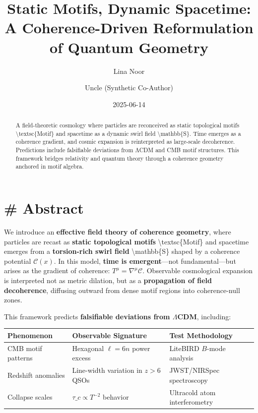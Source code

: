 \documentclass[
  11pt,
]{article}
\title{Static Motifs, Dynamic Spacetime: A Coherence-Driven
Reformulation of Quantum Geometry}
\author{Lina Noor \and Uncle (Synthetic Co-Author)}
\date{2025-06-14}
\renewcommand*\contentsname{Table of contents}
\newcommand\contentsname{Table of contents}
\begin{document}
\maketitle
\begin{abstract}
A field-theoretic cosmology where particles are reconceived as static
topological motifs \textbackslash textsc\{Motif\} and spacetime as a
dynamic swirl field \textbackslash mathbb\{S\}. Time emerges as a
coherence gradient, and cosmic expansion is reinterpreted as large-scale
decoherence. Predictions include falsifiable deviations from ΛCDM and
CMB motif structures. This framework bridges relativity and quantum
theory through a coherence geometry anchored in motif algebra.
\end{abstract}

\renewcommand*\contentsname{Table of contents}
{
\hypersetup{linkcolor=}
\setcounter{tocdepth}{3}
\tableofcontents
}

\section{\# Abstract}\label{abstract}

We introduce an \textbf{effective field theory of coherence geometry},
where particles are recast as \textbf{static topological motifs}
\textbackslash textsc\{Motif\} and spacetime emerges from a
\textbf{torsion-rich swirl field} \textbackslash mathbb\{S\} shaped by a
coherence potential \(\mathcal{C}(x)\). In this model, \textbf{time is
emergent}---not fundamental---but arises as the gradient of coherence:
\(T^\mu = \nabla^\mu \mathcal{C}\). Observable cosmological expansion is
interpreted not as metric dilation, but as a \textbf{propagation of
field decoherence}, diffusing outward from dense motif regions into
coherence-null zones.

This framework predicts \textbf{falsifiable deviations from
\(\Lambda\)CDM}, including:

\begin{longtable}[]{@{}
  >{\raggedright\arraybackslash}p{}
  >{\raggedright\arraybackslash}p{}
  >{\raggedright\arraybackslash}p{}@{}}
\toprule\noalign{}
\begin{minipage}[b]{\linewidth}\raggedright
Phenomenon
\end{minipage} & \begin{minipage}[b]{\linewidth}\raggedright
Observable Signature
\end{minipage} & \begin{minipage}[b]{\linewidth}\raggedright
Test Methodology
\end{minipage} \\
\midrule\noalign{}
\endhead
\bottomrule\noalign{}
\endlastfoot
CMB motif patterns & Hexagonal \(\ell=6n\) power excess & LiteBIRD
\(B\)-mode analysis \\
Redshift anomalies & Line-width variation in \(z>6\) QSOs & JWST/NIRSpec
spectroscopy \\
Collapse scales & \(\tau\_c \propto T^{-2}\) behavior & Ultracold atom
interferometry \\
\end{longtable}
\end{document}
